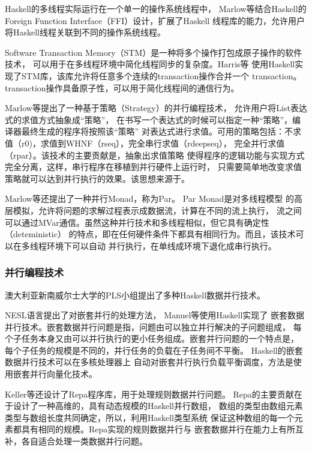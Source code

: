 Haskell的多线程实际运行在一个单一的操作系统线程中，
Marlow等结合Haskell的Foreign Function Interface（FFI）设计，扩展了Haskell
线程库的能力，允许用户将Haskell线程关联到不同的操作系统线程。

Software Transaction Memory（STM）是一种将多个操作打包成原子操作的软件技术，
可以用于在多线程环境中简化线程同步的复杂度。Harris等
使用Haskell实现了STM库，该库允许将任意多个连续的transaction操作合并一个
transaction。transaction操作具备原子性，可以用于简化线程间的通信行为。

Marlow等提出了一种基于策略（Strategy）的并行编程技术，
允许用户将List表达式的求值方式抽象成“策略”，
在书写一个表达式的时候可以指定一种“策略”，编译器最终生成的程序将按照该“策略”
对表达式进行求值。可用的策略包括：不求值（r0)，求值到WHNF（rseq），完全串行求值（rdeepseq），
完全并行求值（rpar）。该技术的主要贡献是，抽象出求值策略
使得程序的逻辑功能与实现方式完全分离，这样，串行程序在移植到并行硬件上运行时，
只需要简单地改变求值策略就可以达到并行执行的效果。该思想来源于。

Marlow等还提出了一种并行Monad，称为Par。
Par Monad是对多线程模型
的高层模拟，允许将问题的求解过程表示成数据流，计算在不同的流上执行，
流之间可以通过MVar通信。虽然这种并行技术和多线程相似，但它具有确定性（deteministic）
的特点，即在任何硬件条件下都具有相同行为。而且，该技术可以在多线程环境下可以自动
并行执行，在单线成环境下退化成串行执行。

\subsubsection{并行编程技术}
澳大利亚新南威尔士大学的PLS小组提出了多种Haskell数据并行技术。

NESL语言提出了对嵌套并行的处理方法，
Manuel等使用Haskell实现了
嵌套数据并行技术。嵌套数据并行问题是指，问题由可以独立并行解决的子问题组成，
每个子任务本身又由可以并行执行的更小任务组成。嵌套并行问题的一个特点是，
每个子任务的规模是不同的，并行任务的负载在子任务间不平衡。
Haskell的嵌套数据并行技术可以在多核处理器上
自动对嵌套并行执行负载平衡调度，方法是使用嵌套并行向量化技术。

Keller等还设计了Repa程序库，用于处理规则数据并行问题。
Repa的主要贡献在于设计了一种高维的，具有动态规模的Haskell并行数组，
数组的类型由数组元素类型与数组长度共同确定，所以，利用Haskell类型系统
保证这种数组的每一个元素都具有相同的规模。Repa实现的规则数据并行与
嵌套数据并行在能力上有所互补，各自适合处理一类数据并行问题。

